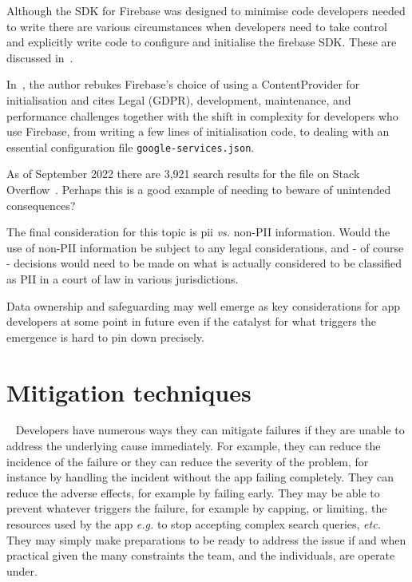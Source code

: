 \begin{kaobox}[frametitle="Firebase Android SDK's use of a ContentProvider"]
Although the SDK for Firebase was designed to minimise code developers needed to write there are various circumstances when developers need to take control and explicitly write code to configure and initialise the firebase SDK. These are discussed in~.

In~, the author rebukes Firebase's choice of using a ContentProvider for initialisation and cites Legal (GDPR), development, maintenance, and performance challenges together with the shift in complexity for developers who use Firebase, from writing a few lines of initialisation code, to dealing with an essential configuration file \texttt{google-services.json}. 

As of  September 2022 there are 3,921 search results for the file on Stack Overflow~. Perhaps this is a good example of needing to beware of unintended consequences?
\end{kaobox}

The final consideration for this topic is \Gls{pii} \emph{vs.} non-PII information. Would the use of non-PII information be subject to any legal considerations, and - of course - decisions would need to be made on what is actually considered to be classified as PII in a court of law in various jurisdictions.

\afterpage{\clearpage}

Data ownership and safeguarding may well emerge as key considerations for app developers at some point in future even if the catalyst for what triggers the emergence is hard to pin down precisely. 


\section{Mitigation techniques}~\label{discussion-mitigation-techniques-section}
Developers have numerous ways they can mitigate failures if they are unable to address the underlying cause immediately. For example, they can reduce the incidence of the failure or they can reduce the severity of the problem, for instance by handling the incident without the app failing completely. They can reduce the adverse effects, for example by failing early. They may be able to prevent whatever triggers the failure, for example by capping, or limiting, the resources used by the app \emph{e.g.} to stop accepting complex search queries, \emph{etc.} They may simply make preparations to be ready to address the issue if and when practical given the many constraints the team, and the individuals,  are operate under.


